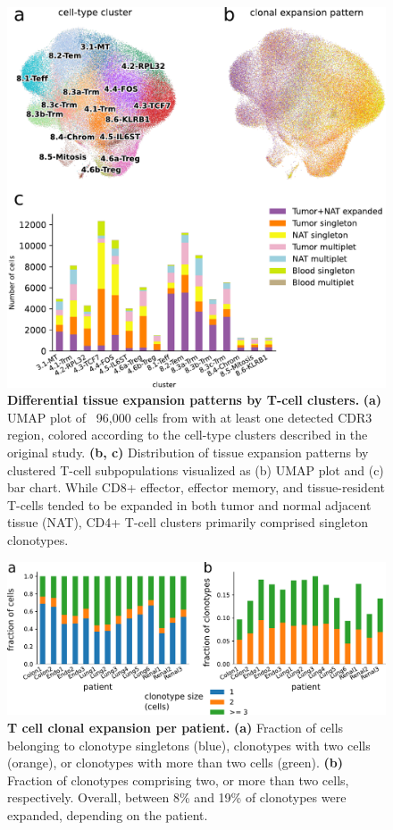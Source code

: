 \documentclass{article}
\begin{document}
\newpage
\begin{figure}[!ht]
  \centering
  \includegraphics[width=7in]{../figures/expansion_per_cluster.pdf}
  \caption{
    \textbf{Differential tissue expansion patterns by T-cell clusters.} 
    \textbf{(a)} UMAP plot of ~96,000 cells from \textcite{Wu2020-vp} with at least one 
    detected CDR3 region, colored according to the cell-type clusters described in the 
    original study. \textbf{(b, c)} Distribution of tissue expansion patterns by clustered 
    T-cell subpopulations visualized as (b) UMAP plot and (c) bar
    chart. While CD8+ effector, effector memory, and tissue-resident T-cells tended 
    to be expanded in both tumor and normal adjacent tissue (NAT), CD4+ T-cell clusters
    primarily comprised singleton clonotypes.}
\end{figure}

\newpage
\begin{figure}[!ht]
  \centering
  \includegraphics[width=7in]{../figures/clonal_expansion.pdf}
  \caption{\textbf{T cell clonal expansion per patient.} \textbf{(a)} Fraction of cells belonging to clonotype singletons (blue), clonotypes with two cells (orange), or clonotypes with more than two cells (green). \textbf{(b)} Fraction of clonotypes comprising two, or more than two cells, respectively. Overall, between 8\% and 19\% of clonotypes were expanded, depending on the patient.}
\end{figure}
\end{document}
